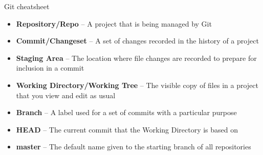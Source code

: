 \documentclass[9pt]{extarticle}
\def\itempad{-1pt}
\begin{document}
\thispagestyle{empty}

\begin{center}
  {\LARGE
  Git cheatsheet}
\end{center}

\begin{bluebox}[title=Git Glossary]
  \begin{itemize}
    \itemsep\itempad
  \item \textbf{Repository/Repo} -- A project that is being managed by Git
  \item \textbf{Commit/Changeset} -- A set of changes recorded in the history of
    a project
  \item \textbf{Staging Area} -- The location where file changes are recorded to
    prepare for inclusion in a commit
  \item \textbf{Working Directory/Working Tree} -- The visible copy of files in a
    project that you view and edit as usual
  \item \textbf{Branch} -- A label used for a set of commits with a particular
    purpose
  \item \textbf{HEAD} -- The current commit that the Working Directory is based on
  \item \textbf{master} -- The default name given to the starting branch of all repositories
  \end{itemize}
\end{bluebox}
\end{document}
